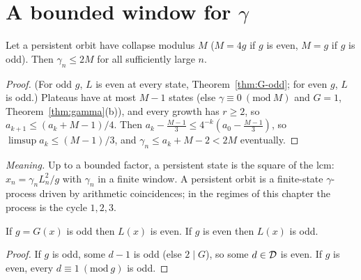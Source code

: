 \section{\texorpdfstring{A bounded window for \(\gamma\)}{A bounded window for gamma}}

\begin{theorem}\label{thm:T47}
Let a persistent orbit have collapse modulus \(M\) (\(M=4g\) if \(g\) is even, \(M=g\) if \(g\) is odd). Then \(\gamma_n\le2M\) for all sufficiently large \(n\).
\end{theorem}
\begin{proof}
(For odd \(g\), \(L\) is even at every state, Theorem~\ref{thm:G-odd}; for even \(g\), \(L\) is odd.) Plateaus have at most \(M-1\) states (else \(\gamma\equiv0\ (\mathrm{mod}\ M)\) and \(G=1\), Theorem~\ref{thm:gamma}(b)), and every growth has \(r\ge2\), so \(a_{k+1}\le(a_k+M-1)/4\). Then \(a_k-\tfrac{M-1}3\le4^{-k}(a_0-\tfrac{M-1}3)\), so \(\limsup a_k\le(M-1)/3\), and \(\gamma_n\le a_k+M-2<2M\) eventually.
\end{proof}

\emph{Meaning.} Up to a bounded factor, a persistent state is the square of the lcm: \(x_n=\gamma_nL_n^2/g\) with \(\gamma_n\) in a finite window. A persistent orbit is a finite-state \(\gamma\)-process driven by arithmetic coincidences; in the regimes of this chapter the process is the cycle \(1,2,3\).

\begin{lemma}\label{thm:G-odd}
If \(g=G(x)\) is odd then \(L(x)\) is even. If \(g\) is even then \(L(x)\) is odd.
\end{lemma}
\begin{proof}
If \(g\) is odd, some \(d-1\) is odd (else \(2\mid G\)), so some \(d\in\mathcal{D}\) is even. If \(g\) is even, every \(d\equiv1\ (\mathrm{mod}\ g)\) is odd.
\end{proof}
